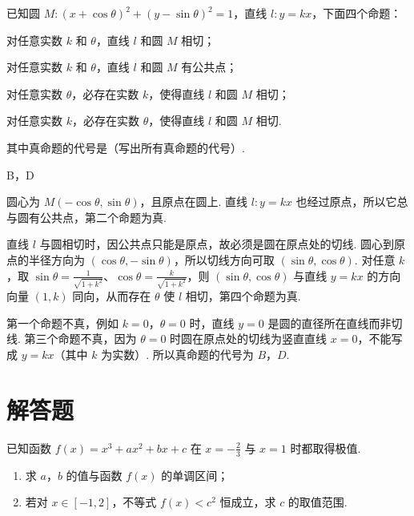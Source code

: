 \begin{problem}
已知圆 \(M: (x + \cos \theta)^2 + (y - \sin \theta)^2 = 1\)，直线 \(l: y = kx\)，下面四个命题：

\begin{circlelist}
\item 对任意实数 \(k\) 和 \(\theta\)，直线 \(l\) 和圆 \(M\) 相切；
\item 对任意实数 \(k\) 和 \(\theta\)，直线 \(l\) 和圆 \(M\) 有公共点；
\item 对任意实数 \(\theta\)，必存在实数 \(k\)，使得直线 \(l\) 和圆 \(M\) 相切；
\item 对任意实数 \(k\)，必存在实数 \(\theta\)，使得直线 \(l\) 和圆 \(M\) 相切.
\end{circlelist}

其中真命题的代号是\fillinblank{}（写出所有真命题的代号）.
\end{problem}

\begin{answer}
B，D
\end{answer}

\begin{solution}
圆心为 \(M(-\cos\theta,\sin\theta)\)，且原点在圆上. 直线 \(l:y=kx\) 也经过原点，所以它总与圆有公共点，第二个命题为真.

直线 \(l\) 与圆相切时，因公共点只能是原点，故必须是圆在原点处的切线. 圆心到原点的半径方向为 \((\cos\theta,-\sin\theta)\)，所以切线方向可取 \((\sin\theta,\cos\theta)\). 对任意 \(k\)，取 \(\sin\theta=\frac{1}{\sqrt{1+k^2}}\)、\(\cos\theta=\frac{k}{\sqrt{1+k^2}}\)，则 \((\sin\theta,\cos\theta)\) 与直线 \(y=kx\) 的方向向量 \((1,k)\) 同向，从而存在 \(\theta\) 使 \(l\) 相切，第四个命题为真.

第一个命题不真，例如 \(k=0\)，\(\theta=0\) 时，直线 \(y=0\) 是圆的直径所在直线而非切线. 第三个命题不真，因为 \(\theta=0\) 时圆在原点处的切线为竖直直线 \(x=0\)，不能写成 \(y=kx\)（其中 \(k\) 为实数）. 所以真命题的代号为 \(B\)，\(D\).
\end{solution}

\section{解答题}
\begin{problem}
已知函数 \( f(x) = x^3 + ax^2 + bx + c \) 在 \( x = -\frac{2}{3} \) 与 \( x = 1 \) 时都取得极值.

\begin{enumerate}
\item 求 \(a\)，\(b\) 的值与函数 \(f(x)\) 的单调区间；
\item 若对 \(x \in [-1, 2]\)，不等式 \(f(x) < c^2\) 恒成立，求 \(c\) 的取值范围.
\end{enumerate}
\end{problem}

